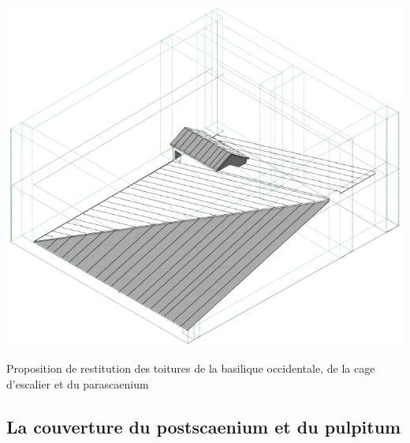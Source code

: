 		\begin{figureth}
			\includegraphics[width=\linewidth]{images/couvertureBadie}
			\caption[Toitures de basiliques par A.Badie]{Proposition de restitution des toitures de la \gls{basilique} occidentale, de la cage d'escalier et du \gls{parascaenium} \cite[Pl. XLVII]{orangePl}}
			\label{couvertureBadie}
		\end{figureth}	

		
		\subsection{La couverture du \gls{postscaenium} et du \gls{pulpitum}}
		
